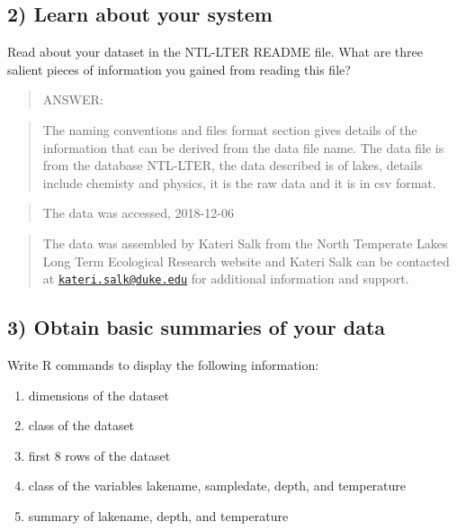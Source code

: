 \documentclass[]{article}
\providecommand{\tightlist}{%
  \setlength{\itemsep}{0pt}\setlength{\parskip}{0pt}}
\begin{document}
\subsection{2) Learn about your system}\label{learn-about-your-system}

Read about your dataset in the NTL-LTER README file. What are three
salient pieces of information you gained from reading this file?

\begin{quote}
ANSWER:
\end{quote}

\begin{quote}
The naming conventions and files format section gives details of the
information that can be derived from the data file name. The data file
is from the database NTL-LTER, the data described is of lakes, details
include chemisty and physics, it is the raw data and it is in csv
format.
\end{quote}

\begin{quote}
The data was accessed, 2018-12-06
\end{quote}

\begin{quote}
The data was assembled by Kateri Salk from the North Temperate Lakes
Long Term Ecological Research website and Kateri Salk can be contacted
at \href{mailto:kateri.salk@duke.edu}{\nolinkurl{kateri.salk@duke.edu}}
for additional information and support.
\end{quote}

\subsection{3) Obtain basic summaries of your
data}\label{obtain-basic-summaries-of-your-data}

Write R commands to display the following information:

\begin{enumerate}
\def\labelenumi{\arabic{enumi}.}
\tightlist
\item
  dimensions of the dataset
\item
  class of the dataset
\item
  first 8 rows of the dataset
\item
  class of the variables lakename, sampledate, depth, and temperature
\item
  summary of lakename, depth, and temperature
\end{enumerate}
\end{document}
